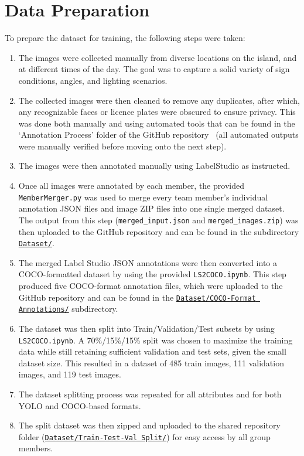 \documentclass{article}
\begin{document}
\section{Data Preparation}
To prepare the dataset for training, the following steps were taken:
\begin{enumerate}
    \item The images were collected manually from diverse locations on the island, and at different times of the day. The goal was to capture a solid variety of sign conditions, angles, and lighting scenarios.
    \item The collected images were then cleaned to remove any duplicates, after which, any recognizable faces or licence plates were obscured to ensure privacy. This was done both manually and using automated tools that can be found in the `Annotation Process' folder of the GitHub repository~\cite{github_repo} (all automated outputs were manually verified before moving onto the next step).
    \item The images were then annotated manually using LabelStudio as instructed.
    \item Once all images were annotated by each member, the provided \verb|MemberMerger.py| was used to merge every team member's individual annotation JSON files and image ZIP files into one single merged dataset. The output from this step (\verb|merged_input.json| and \verb|merged_images.zip|) was then uploaded to the GitHub repository and can be found in the subdirectory \href{https://github.com/spiteriamy/ari3129-cv-group-project/tree/main/Dataset}{\texttt{Dataset/}}.
    \item The merged Label Studio JSON annotations were then converted into a COCO-formatted dataset by using the provided \verb|LS2COCO.ipynb|. This step produced five COCO-format annotation files, which were uploaded to the GitHub repository and can be found in the \href{https://github.com/spiteriamy/ari3129-cv-group-project/tree/main/Dataset/COCO-Format%20Annotations}{\texttt{Dataset/COCO-Format Annotations/}} subdirectory.
    \item The dataset was then split into Train/Validation/Test subsets by using \verb|LS2COCO.ipynb|. A 70\%/15\%/15\% split was chosen to maximize the training data while still retaining sufficient validation and test sets, given the small dataset size. This resulted in a dataset of 485 train images, 111 validation images, and 119 test images.
    \item The dataset splitting process was repeated for all attributes and for both YOLO and COCO-based formats.
    \item The split dataset was then zipped and uploaded to the shared repository folder (\href{https://github.com/spiteriamy/ari3129-cv-group-project/tree/main/Dataset/Train-Test-Val%20Split}{\texttt{Dataset/Train-Test-Val Split/}}) for easy access by all group members.
\end{enumerate}
\end{document}
